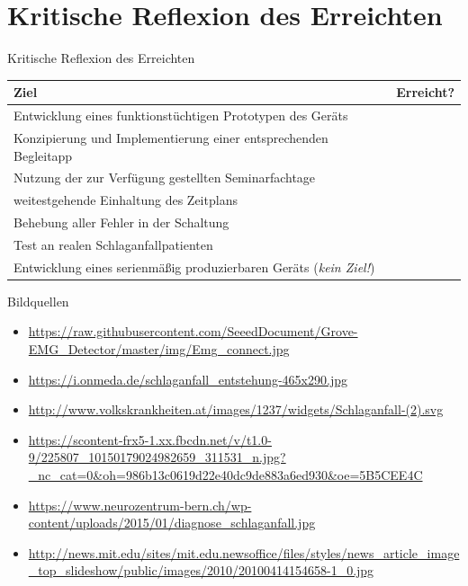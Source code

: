 \documentclass[hyphens]{beamer}
\newcommand{\xmark}{\ding{55}}
\begin{document}
 \section*{Kritische Reflexion des Erreichten}
 \begin{frame}{Kritische Reflexion des Erreichten}
 	\begin{table}
 		\begin{tabularx}{\textwidth}{|Z|c|}
 			\hline
 			\textbf{Ziel} & \textbf{Erreicht?} \\
 			\hline
 			\hline
 			Entwicklung eines funktionstüchtigen Prototypen des Geräts & \checkmark \\
 			\hline
 			Konzipierung und Implementierung einer entsprechenden Begleitapp & \checkmark \\
 			\hline
 			Nutzung der zur Verfügung gestellten Seminarfachtage  & \checkmark \\
 			\hline
 			weitestgehende Einhaltung des Zeitplans & \checkmark \\
 			\hline
 			Behebung aller Fehler in der Schaltung & \xmark \\ 
 			\hline
 			Test an realen Schlaganfallpatienten & \xmark \\ 
 			\hline
 			Entwicklung eines serienmäßig produzierbaren Geräts (\emph{kein Ziel!}) & \xmark \\ 
 			\hline
 		\end{tabularx}
 	\end{table}
 \end{frame}

 \begin{frame}{Bildquellen}
 \begin{itemize}
 \item \small{\url{https://raw.githubusercontent.com/SeeedDocument/Grove-EMG_Detector/master/img/Emg_connect.jpg}}
 \item \small{\url{https://i.onmeda.de/schlaganfall_entstehung-465x290.jpg}}
 \item \small{\url{http://www.volkskrankheiten.at/images/1237/widgets/Schlaganfall-(2).svg}}
 \item \small{\url{https://scontent-frx5-1.xx.fbcdn.net/v/t1.0-9/225807_10150179024982659_311531_n.jpg?_nc_cat=0&oh=986b13c0619d22e40dc9de883a6ed930&oe=5B5CEE4C}}
 \item  \small{\url{https://www.neurozentrum-bern.ch/wp-content/uploads/2015/01/diagnose_schlaganfall.jpg}}
 \item  \small{\url{http://news.mit.edu/sites/mit.edu.newsoffice/files/styles/news_article_image_top_slideshow/public/images/2010/20100414154658-1_0.jpg}}
 \end{itemize}
 \end{frame}
\end{document}
